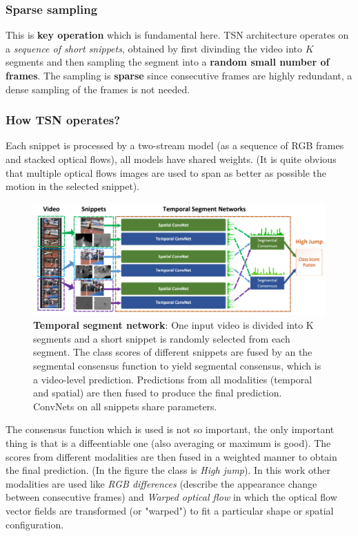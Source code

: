 \subsubsection{Sparse sampling}
This is \textbf{key operation} which is fundamental here.
TSN architecture operates on a \textit{sequence of short snippets}, obtained by first divinding the video into $K$ segments and then sampling the segment into a \textbf{random small number of frames}. The sampling is \textbf{sparse} since consecutive frames are highly  redundant, a dense sampling of the frames is not needed.

\subsubsection{How TSN operates?}
Each snippet is processed by a two-stream model (as a sequence of RGB frames and stacked optical flows), all models have shared weights. (It is quite obvious that multiple optical flows images are used to span as better as  possible the motion in the selected snippet).

\begin{figure}[h]
    \centering
    \includegraphics[scale=0.8]{img/TSN.png}
    \caption{\textbf{Temporal segment network}: One input video is divided into K segments and a short snippet is randomly selected from each segment. The class scores of different snippets are fused by an the segmental consensus function to yield segmental consensus, which is a video-level prediction. Predictions from all modalities (temporal and spatial) are then fused to produce the final prediction. ConvNets on all snippets share parameters.}
\end{figure}

The consensus function which is used is not so important, the only important thing is that is a diffeentiable one (also averaging or maximum is good). The scores from different modalities are then fused in a weighted manner to obtain the final prediction. (In the figure the class is \textit{High jump}). In this work other modalities are used like \textit{RGB differences} (describe the appearance change between consecutive frames) and \textit{Warped optical flow} in which the optical flow vector fields are transformed (or "warped") to fit a particular shape or spatial configuration.

